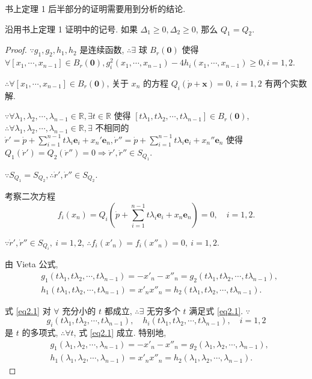 \documentclass[color=black,device=normal,lang=cn,mode=geye]{elegantnote}
\begin{document}
书上定理 1 后半部分的证明需要用到分析的结论.
\begin{theorem}
    沿用书上定理 1 证明中的记号. 如果 $\Delta_1\geq0,\Delta_2\geq0$, 那么 $Q_1=Q_2$.
\end{theorem}
\begin{proof}
    $\because g_1,g_2,h_1,h_2$ 是连续函数, $\therefore\exists$ 球 $B_r(\boldsymbol{0})$ 使得 $\forall[x_1,\cdots,x_{n-1}]\in B_r(\boldsymbol{0}),g_i^2(x_1,\cdots,x_{n-1})-4h_i(x_1,\cdots,x_{n-1})\geq0,i=1,2$.

    $\therefore\forall[x_1,\cdots,x_{n-1}]\in B_r(\boldsymbol{0})$, 关于 $x_n$ 的方程 $Q_i(\dot{p}+\boldsymbol{x})=0,\ i=1,2$ 有两个实数解.

    $\because\forall\lambda_1,\lambda_2,\cdots,\lambda_{n-1}\in\mathbb{R},\exists t\in\mathbb{R}$ 使得 $[t\lambda_1,t\lambda_2,\cdots,t\lambda_{n-1}]\in B_r(\boldsymbol{0})$, $\therefore\forall\lambda_1,\lambda_2,\cdots,\lambda_{n-1}\in\mathbb{R},\exists$ 不相同的 $\dot{r}'=\dot{p}+\sum\limits_{i=1}^{n-1}t\lambda_i\boldsymbol{e}_i+x_n'\boldsymbol{e}_n,\dot{r}''=\dot{p}+\sum\limits_{i=1}^{n-1}t\lambda_i\boldsymbol{e}_i+x_n''\boldsymbol{e}_n$ 使得 $Q_1(\dot{r}')=Q_2(\dot{r}'')=0\Rightarrow\dot{r}',\dot{r}''\in S_{Q_1}$.

    $\because S_{Q_1}=S_{Q_2},\therefore\dot{r}',\dot{r}''\in S_{Q_2}$.

    考察二次方程
    \[f_i(x_n)=Q_i\left(\dot{p}+\sum\limits_{i=1}^{n-1}t\lambda_i\boldsymbol{e}_i+x_n\boldsymbol{e}_n\right)=0,\quad i=1,2.\]

    $\because\dot{r}',\dot{r}''\in S_{Q_i},\ i=1,2$, $\therefore f_i(x'_n)=f_i(x''_n)=0,\ i=1,2$.

    由 Vieta 公式,
    \begin{equation}\label{eq2.1}
        \begin{aligned}
            & g_1(t\lambda_1,t\lambda_2,\cdots,t\lambda_{n-1})=-x'_n-x''_n=g_2(t\lambda_1,t\lambda_2,\cdots,t\lambda_{n-1}), \\
            & h_1(t\lambda_1,t\lambda_2,\cdots,t\lambda_{n-1})=x'_nx''_n=h_2(t\lambda_1,t\lambda_2,\cdots,t\lambda_{n-1}).
        \end{aligned}
    \end{equation}

    式 \ref{eq2.1} 对 $\forall$ 充分小的 $t$ 都成立, $\therefore\exists$ 无穷多个 $t$ 满足式 \ref{eq2.1}. $\because$
    \[g_i(t\lambda_1,t\lambda_2,\cdots,t\lambda_{n-1}),\quad h_i(t\lambda_1,t\lambda_2,\cdots,t\lambda_{n-1}),\quad i=1,2\]
    是 $t$ 的多项式, $\therefore\forall t$, 式 \ref{eq2.1} 成立. 特别地,
    \begin{equation}\label{eq2.2}
        \begin{aligned}
            & g_1(\lambda_1,\lambda_2,\cdots,\lambda_{n-1})=-x'_n-x''_n=g_2(\lambda_1,\lambda_2,\cdots,\lambda_{n-1}), \\
            & h_1(\lambda_1,\lambda_2,\cdots,\lambda_{n-1})=x'_nx''_n=h_2(\lambda_1,\lambda_2,\cdots,\lambda_{n-1}).
        \end{aligned}
    \end{equation}


\end{proof}
\end{document}
